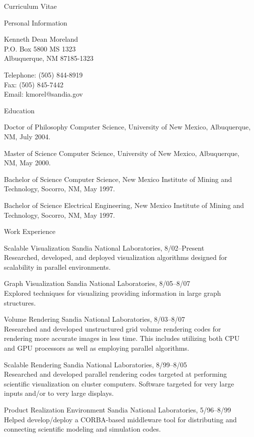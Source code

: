 \documentclass{article}
\date{January  9, 2008}
\begin{document}
  \begin{cv}{Curriculum Vitae}

    \begin{cvlist}{Personal Information}
      \item Kenneth Dean Moreland \\
        P.O. Box 5800  MS 1323 \\
        Albuquerque, NM  87185-1323
      \item Telephone: (505) 844-8919 \\
        Fax: (505) 845-7442 \\
        Email: kmorel@sandia.gov
    \end{cvlist}

    \begin{cvlist}{Education}
      \item[Doctor of Philosophy] Computer Science, University of New
        Mexico, Albuquerque, NM, July 2004.
      \item[Master of Science] Computer Science, University of New Mexico,
        Albuquerque, NM, May 2000.
      \item[Bachelor of Science] Computer Science, New Mexico Institute of
        Mining and Technology, Socorro, NM, May 1997.
      \item[Bachelor of Science] Electrical Engineering, New Mexico
        Institute of Mining and Technology, Socorro, NM, May 1997.
    \end{cvlist}

    \begin{cvlist}{Work Experience}
    \item[Scalable Visualization] Sandia National Laboratories, 8/02--Present \\
      Researched, developed, and deployed visualization algorithms designed
      for scalability in parallel environments.
    \item[Graph Visualization] Sandia National Laboratories, 8/05--8/07 \\
      Explored techniques for visualizing providing information in large
      graph structures.
    \item[Volume Rendering] Sandia National Laboratories, 8/03--8/07 \\
      Researched and developed unstructured grid volume rendering codes for
      rendering more accurate images in less time.  This includes utilizing
      both CPU and GPU processors as well as employing parallel algorithms.
    \item[Scalable Rendering] Sandia National Laboratories, 8/99--8/05 \\
      Researched and developed parallel rendering codes targeted at
      performing scientific visualization on cluster computers.  Software
      targeted for very large inputs and/or to very large displays.
    \item[Product Realization Environment] Sandia National Laboratories,
      5/96--8/99 \\
      Helped develop/deploy a CORBA-based middleware tool for distributing
      and connecting scientific modeling and simulation codes.
    \end{cvlist}


\end{cv}
\end{document}
